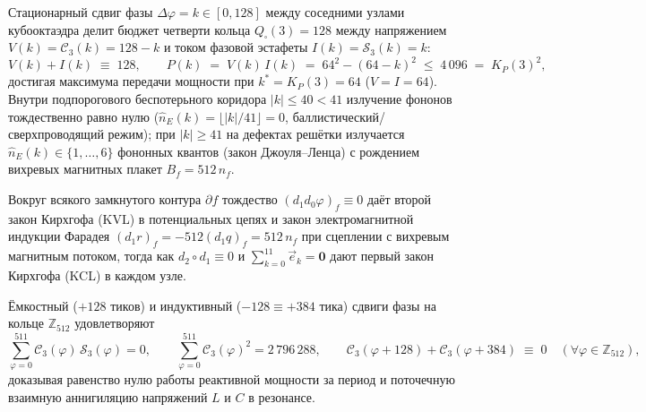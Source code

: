 \begin{theorem}
\label{thm:eng-dc-ohm-mppt}
Стационарный сдвиг фазы $\Delta\varphi = k \in [0,128]$ между соседними узлами кубооктаэдра делит бюджет четверти кольца $Q_\square(3) = 128$ между напряжением $V(k) = \mathcal{C}_3(k) = 128 - k$ и током фазовой эстафеты $I(k) = \mathcal{S}_3(k) = k$:
\begin{equation}
  \label{eq:eng-dc-ohm-mppt}
  V(k) + I(k) \;\equiv\; 128, \qquad
  P(k) \;=\; V(k)\,I(k) \;=\; 64^2 - (64 - k)^2 \;\le\; 4\,096 \;=\; K_P(3)^2,
\end{equation}
достигая максимума передачи мощности при $k^* = K_P(3) = 64$ ($V = I = 64$). Внутри подпорогового беспотерьного коридора $|k| \le 40 < 41$ излучение фононов тождественно равно нулю ($\hat{n}_E(k) = \lfloor|k|/41\rfloor = 0$, баллистический/сверхпроводящий режим); при $|k| \ge 41$ на дефектах решётки излучается $\hat{n}_E(k) \in \{1,\dots,6\}$ фононных квантов (закон Джоуля--Ленца) с рождением вихревых магнитных плакет $B_f = 512\,n_f$.
\end{theorem}

\begin{theorem}
\label{thm:eng-kirchhoff-faraday}
Вокруг всякого замкнутого контура $\partial f$ тождество $(d_1 d_0\varphi)_f \equiv 0$ даёт второй закон Кирхгофа (KVL) в потенциальных цепях и закон электромагнитной индукции Фарадея $(d_1 r)_f = -512(d_1 q)_f = 512\,n_f$ при сцеплении с вихревым магнитным потоком, тогда как $d_2\circ d_1 \equiv 0$ и $\sum_{k=0}^{11}\vec{e}_k = \mathbf{0}$ дают первый закон Кирхгофа (KCL) в каждом узле.
\end{theorem}

\begin{theorem}
\label{thm:eng-ac-rlc}
Ёмкостный ($+128$ тиков) и индуктивный ($-128 \equiv +384$ тика) сдвиги фазы на кольце $\mathbb{Z}_{512}$ удовлетворяют
\begin{equation}
  \label{eq:eng-ac-rlc}
  \sum_{\varphi=0}^{511} \mathcal{C}_3(\varphi)\,\mathcal{S}_3(\varphi) = 0, \qquad
  \sum_{\varphi=0}^{511} \mathcal{C}_3(\varphi)^2 = 2\,796\,288, \qquad
  \mathcal{C}_3(\varphi + 128) + \mathcal{C}_3(\varphi + 384) \;\equiv\; 0 \quad (\forall\varphi\in\mathbb{Z}_{512}),
\end{equation}
доказывая равенство нулю работы реактивной мощности за период и поточечную взаимную аннигиляцию напряжений $L$ и $C$ в резонансе.
\end{theorem}


